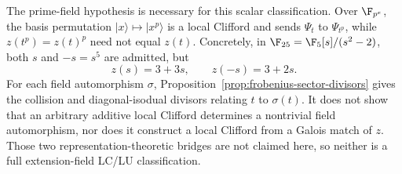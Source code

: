 The prime-field hypothesis is necessary for this scalar classification.
Over \(\F_{p^e}\), the basis permutation
\(\lvert x\rangle\mapsto\lvert x^p\rangle\) is a local Clifford and sends
\(\Psi_t\) to \(\Psi_{t^p}\), while \(z(t^p)=z(t)^p\) need not equal
\(z(t)\).  Concretely, in
\(\F_{25}=\F_5[s]/(s^2-2)\), both \(s\) and \(-s=s^5\) are admitted, but
\[
 z(s)=3+3s,\qquad z(-s)=3+2s.
\]
For each field automorphism \(\sigma\),
Proposition~\ref{prop:frobenius-sector-divisors} gives the collision and
diagonal-isodual divisors relating \(t\) to \(\sigma(t)\).  It does not
show that an arbitrary additive local Clifford determines a nontrivial
field automorphism, nor does it construct a local Clifford from a Galois
match of \(z\).  Those two representation-theoretic bridges are not
claimed here, so neither is a full extension-field LC/LU classification.
